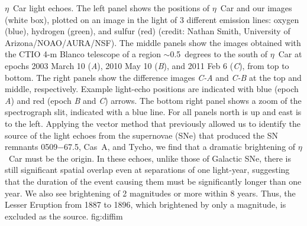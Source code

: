 {$\eta$~Car light echoes. The left panel shows the positions of
$\eta$~Car and our images (white box), plotted on an image
in the light of 3 different emission lines:
oxygen (blue), hydrogen (green), and sulfur (red) (credit:
Nathan Smith, University of Arizona/NOAO/AURA/NSF).
%
%
The middle panels show the images obtained with the CTIO 4-m
Blanco telescope of a region $\sim$0.5~degrees to the south of
$\eta$~Car at epochs 2003 March 10 ({\it A}), 2010 May 10 ({\it B}),
and 2011 Feb 6 ({\it C}), from top to bottom.  The right panels show
the difference images {\it C-A} and {\it C-B} at the top and middle,
respectively. Example light-echo positions are indicated with blue
(epoch {\it A}) and red (epoch {\it B} and {\it C}) arrows.  The
bottom right panel shows a zoom of the spectrograph slit, indicated
with a blue line.  For all panels north is up and east is to the left.
Applying the vector method that previously allowed us to identify the
source of the light echoes from the supernovae (SNe) that produced the
SN remnants 0509$-$67.5, Cas~A, and Tycho\cite{Rest05b,Rest08b}, we
find that a dramatic brightening of $\eta$~Car must be the origin.  In
these echoes, unlike those of Galactic SNe\cite{Rest11_leprofile},
there is still significant spatial overlap even at separations of one
light-year, suggesting that the duration of the event causing them
must be significantly longer than one year.  We also see brightening
of 2 magnitudes or more within 8 years.  Thus, the Lesser Eruption
from 1887 to 1896, which brightened by only a magnitude, is excluded
as the source.
}
{fig:diffim}

